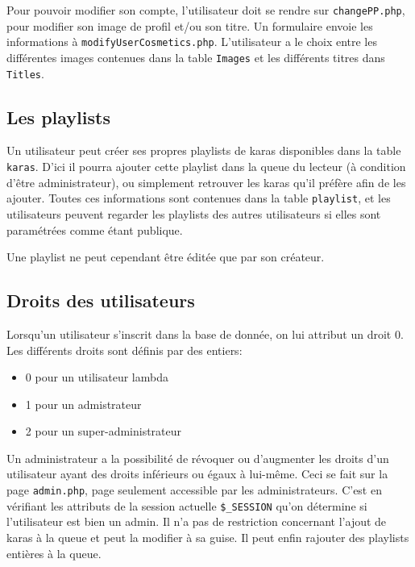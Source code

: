 Pour pouvoir modifier son compte, l'utilisateur doit se rendre sur \texttt{changePP.php}, pour modifier son image de profil et/ou son titre. Un formulaire envoie les informations à \texttt{modifyUserCosmetics.php}. L'utilisateur a le choix entre les différentes images contenues dans la table \texttt{Images} et les différents titres dans \texttt{Titles}.

\subsection{Les playlists}

Un utilisateur peut créer ses propres playlists de karas disponibles dans la table \texttt{karas}.
D'ici il pourra ajouter cette playlist dans la queue du lecteur (à condition d'être administrateur), ou simplement retrouver les karas qu'il préfère afin de les ajouter.
Toutes ces informations sont contenues dans la table \texttt{playlist}, et les utilisateurs peuvent regarder les playlists des autres utilisateurs si elles sont paramétrées comme étant publique.

Une playlist ne peut cependant être éditée que par son créateur.

\subsection{Droits des utilisateurs}
Lorsqu'un utilisateur s'inscrit dans la base de donnée, on lui attribut un droit 0. Les différents droits sont définis par des entiers:
\begin{itemize}
	\item 0 pour un utilisateur lambda
	\item 1 pour un admistrateur
	\item 2 pour un super-administrateur
\end{itemize}
Un administrateur a la possibilité de révoquer ou d'augmenter les droits d'un utilisateur ayant des droits inférieurs ou égaux à lui-même. Ceci se fait sur la page \texttt{admin.php}, page seulement accessible par les administrateurs. C'est en vérifiant les attributs de la session actuelle \texttt{\$\_SESSION} qu'on détermine si l'utilisateur est bien un admin. Il n'a pas de restriction concernant l'ajout de karas à la queue et peut la modifier à sa guise. Il peut enfin rajouter des playlists entières à la queue.
